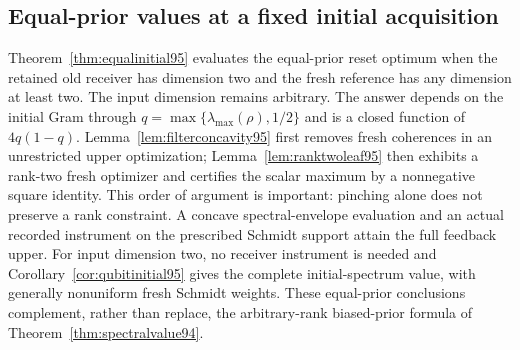\subsection{Equal-prior values at a fixed initial acquisition}
Theorem~\ref{thm:equalinitial95} evaluates the equal-prior reset optimum
when the retained old receiver has dimension two and the fresh reference
has any dimension at least two.  The input dimension remains arbitrary.
The answer depends on the initial Gram through
$q=\max\{\lambda_{\max}(\rho),1/2\}$ and is a closed function of
$4q(1-q)$.  Lemma~\ref{lem:filterconcavity95} first removes fresh
coherences in an unrestricted upper optimization;
Lemma~\ref{lem:ranktwoleaf95} then exhibits a rank-two fresh optimizer
and certifies the scalar maximum by a nonnegative square identity.
This order of argument is important: pinching alone does not preserve a
rank constraint.  A concave spectral-envelope evaluation and an actual
recorded instrument on the prescribed Schmidt support attain the full
feedback upper.  For input dimension two, no receiver instrument is
needed and Corollary~\ref{cor:qubitinitial95} gives the complete
initial-spectrum value, with generally nonuniform fresh Schmidt weights.
These equal-prior conclusions complement, rather than replace, the
arbitrary-rank biased-prior formula of
Theorem~\ref{thm:spectralvalue94}.
